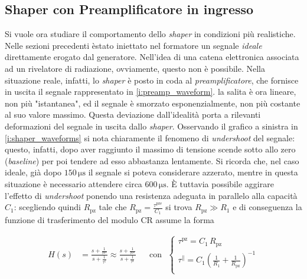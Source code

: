 \documentclass[a4paper,11pt]{article} %
\begin{document}
\subsection{Shaper con Preamplificatore in ingresso}\label{s:shaper_preamp}

Si vuole ora studiare il comportamento dello \textit{shaper} in condizioni più realistiche. Nelle sezioni precedenti
èstato iniettato nel formatore un segnale \textit{ideale} direttamente erogato dal generatore. Nell'idea di una catena
elettronica associata ad un rivelatore di radiazione, ovviamente, questo non è possibile. Nella situazione reale,
infatti, lo \textit{shaper} è posto in coda al \textit{preamplificatore}, che fornisce in uscita il segnale
rappresentato in \autoref{i:preamp_waveform}. la salita è ora lineare, non più "istantanea", ed il segnale è smorzato
esponenzialmente, non più costante al suo valore massimo. Questa deviazione dall'idealità porta a rilevanti deformazioni
del segnale in uscita dallo \textit{shaper}. Osservando il grafico a sinistra in \autoref{i:shaper_waveforms} si nota
chiaramente il fenomeno di \textit{undershoot} del segnale: questo, infatti, dopo aver raggiunto il massimo di tensione
scende sotto allo zero (\textit{baseline}) per poi tendere ad esso abbastanza lentamente. Si ricorda che, nel caso
ideale, già dopo $150\,\si{\us}$ il segnale si poteva considerare azzerato, mentre in questa situazione è necessario
attendere circa $600\,\si{\us}$. È tuttavia possibile aggirare l'effetto di \textit{undershoot} ponendo una resistenza
adeguata in parallelo alla capacità $C_{1}$: scegliendo quindi $R_{\text{pz}}$ tale che $R_{\text{pz}} =
\frac{\tau^{\text{pre}}}{C_{1}}$ si trova $R_{\text{pz}} \gg R_{1}$ e di conseguenza la funzione di trasferimento del
modulo CR assume la forma

\begin{align} 
	H(s) &= \frac{s + \frac{ 1 }{ \tau^{ \text{pz} } }
		}
		{
		s + \frac{ 1 }{ \tau^{ \parallel } }
		} 
	\approx
	\frac{
		s + \frac{ 1 }{ \tau^{ \text{pz} } }
		}
		{
		s + \frac{ 1 }{ \tau^{ \text{1} } }
		} &
	&\text{con} \,\,\,\,    
	\begin{cases} \tau^{ \text{pz} } = C_{ 1 }\, R_{ \text{pz} }  \\
		\tau^{ \parallel } = C_{ 1 }\left(\frac{1}{R_{1}}+\frac{1}{R_{\text{pz}}}\right)^{-1}\\
	\end{cases} 
\end{align}
\end{document}
